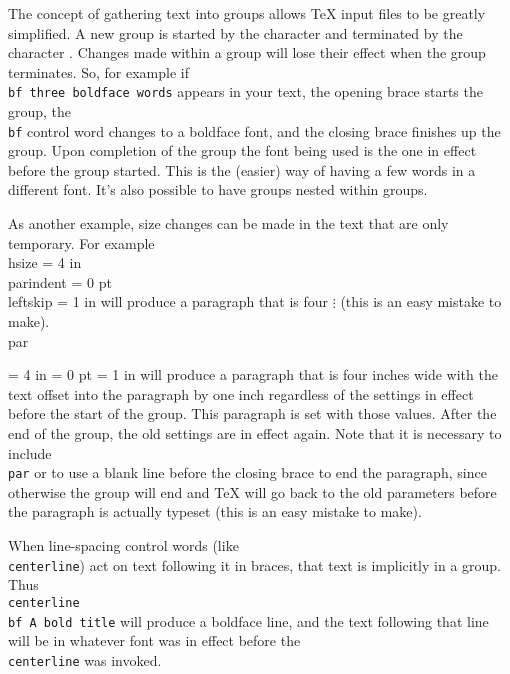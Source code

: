 The concept of gathering text into groups allows \TeX{} input 
files to be greatly simplified.  A new group is started by the 
character {\tt\lb} and terminated by the character {\tt \rb}\null. 
Changes made within a group will lose their effect when the 
group terminates.  So, for example if {\tt \lb \\bf three 
boldface words\rb} appears in your text, the opening brace starts 
the group, the {\tt \\bf} control word changes to a boldface 
font, and the closing brace finishes up the group.  Upon 
completion of the group the font being used is the one in effect 
before the group started.  This is the (easier) way of having a 
few words in a different font.  It's also possible to have groups 
nested within groups. 
 
 
As another example, size changes can be made in the text that are 
only temporary.  For example 
\beginuser 
\lb 
\\hsize = 4 in 
\\parindent = 0 pt 
\\leftskip = 1 in 
will produce a paragraph that is four 
$\vdots$ 
(this is an easy mistake to make). 
\\par 
\rb 
\enduser 
 
{\hsize = 4 in 
\parindent = 0 pt 
\leftskip = 1 in 
will produce a paragraph that is four inches wide with the text 
offset into the paragraph by one inch regardless of the settings 
in effect before the start of the group.  This paragraph is set 
with those values. After the end of the group, the old settings 
are in effect again. Note that it is necessary to include 
{\tt \\par} or to use a blank line before the closing brace to end 
the paragraph, since otherwise the group will end and \TeX{} will 
go back to the old parameters before the paragraph is actually 
typeset (this is an easy mistake to make). \par} 
 
When line-spacing control words (like {\tt \\centerline}) act on text 
following it in braces, that text is implicitly in a group. Thus 
{\tt \\centerline\lb\\bf A bold title\rb} will produce a \centred{} 
boldface line, and the text following that line will be in 
whatever font was in effect before the {\tt \\centerline} was 
invoked. 
 
